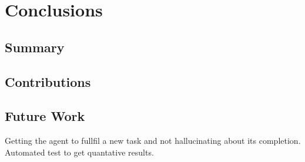 \documentclass[../report.tex]{subfiles}
\begin{document}
\section{Conclusions}
\label{sec:conclusions}

\subsection{Summary}
\label{sec:conclusions:summary}

\subsection{Contributions}
\label{sec:conclusions:contributions}

\subsection{Future Work}
\label{sec:conclusions:future_work}
Getting the agent to fullfil a new task and not hallucinating about its completion. \\
Automated test to get quantative results.
\end{document}
